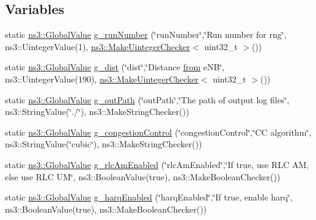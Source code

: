 \subsection*{Variables}
\begin{DoxyCompactItemize}
\item 
static \hyperlink{classns3_1_1GlobalValue}{ns3\+::\+Global\+Value} \hyperlink{dce-example-mptcp-mmwave_8cc_ace0dc10c409e349b7e4587be2429e702}{g\+\_\+run\+Number} (\char`\"{}run\+Number\char`\"{},\char`\"{}Run number for rng\char`\"{}, ns3\+::\+Uinteger\+Value(1), \hyperlink{namespacens3_aed274764da411ed9397a3524a7c9abb8}{ns3\+::\+Make\+Uinteger\+Checker}$<$ uint32\+\_\+t $>$())
\item 
static \hyperlink{classns3_1_1GlobalValue}{ns3\+::\+Global\+Value} \hyperlink{dce-example-mptcp-mmwave_8cc_aba9a4c93c4a96f09b0cf135755d6eb41}{g\+\_\+dist} (\char`\"{}dist\char`\"{},\char`\"{}Distance \hyperlink{lte__amc_8m_a1b4c81ff74eb1a626b5ade44c81004b3}{from} e\+NB\char`\"{}, ns3\+::\+Uinteger\+Value(190), \hyperlink{namespacens3_aed274764da411ed9397a3524a7c9abb8}{ns3\+::\+Make\+Uinteger\+Checker}$<$ uint32\+\_\+t $>$())
\item 
static \hyperlink{classns3_1_1GlobalValue}{ns3\+::\+Global\+Value} \hyperlink{dce-example-mptcp-mmwave_8cc_a3b7adf32c5e93e9c5886e2c86c732557}{g\+\_\+out\+Path} (\char`\"{}out\+Path\char`\"{},\char`\"{}The path of output log files\char`\"{}, ns3\+::\+String\+Value(\char`\"{}./\char`\"{}), ns3\+::\+Make\+String\+Checker())
\item 
static \hyperlink{classns3_1_1GlobalValue}{ns3\+::\+Global\+Value} \hyperlink{dce-example-mptcp-mmwave_8cc_ad03068a716d0c10c0eb468ff51a24e60}{g\+\_\+congestion\+Control} (\char`\"{}congestion\+Control\char`\"{},\char`\"{}CC algorithm\char`\"{}, ns3\+::\+String\+Value(\char`\"{}cubic\char`\"{}), ns3\+::\+Make\+String\+Checker())
\item 
static \hyperlink{classns3_1_1GlobalValue}{ns3\+::\+Global\+Value} \hyperlink{dce-example-mptcp-mmwave_8cc_ad58c0bca4940ad128156370612451147}{g\+\_\+rlc\+Am\+Enabled} (\char`\"{}rlc\+Am\+Enabled\char`\"{},\char`\"{}If true, use R\+LC AM, else use R\+LC UM\char`\"{}, ns3\+::\+Boolean\+Value(true), ns3\+::\+Make\+Boolean\+Checker())
\item 
static \hyperlink{classns3_1_1GlobalValue}{ns3\+::\+Global\+Value} \hyperlink{dce-example-mptcp-mmwave_8cc_a1e2056df7a9173f1be0b611f2e3a15e0}{g\+\_\+harq\+Enabled} (\char`\"{}harq\+Enabled\char`\"{},\char`\"{}If true, enable harq\char`\"{}, ns3\+::\+Boolean\+Value(true), ns3\+::\+Make\+Boolean\+Checker())
\end{DoxyCompactItemize}


